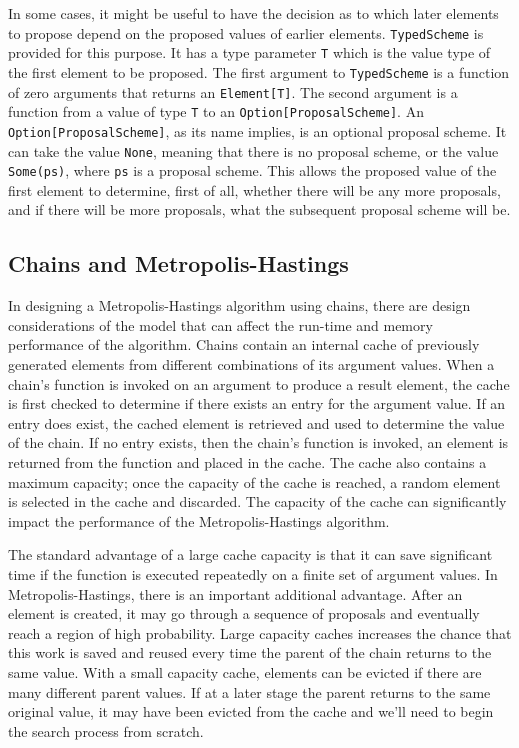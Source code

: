 In some cases, it might be useful to have the decision as to which later elements to propose depend on the proposed values of earlier elements. \texttt{TypedScheme} is provided for this purpose. It has a type parameter \texttt{T} which is the value type of the first element to be proposed. The first argument to \texttt{TypedScheme} is a function of zero arguments that returns an \texttt{Element[T]}. The second argument is a function from a value of type \texttt{T} to an \texttt{Option[ProposalScheme]}. An \texttt{Option[Proposal\-Scheme]}, as its name implies, is an optional proposal scheme. It can take the value \texttt{None}, meaning that there is no proposal scheme, or the value \texttt{Some(ps)}, where \texttt{ps} is a proposal scheme. This allows the proposed value of the first element to determine, first of all, whether there will be any more proposals, and if there will be more proposals, what the subsequent proposal scheme will be.

\subsection{Chains and Metropolis-Hastings}

In designing a Metropolis-Hastings algorithm using chains, there are design considerations of the model that can affect the run-time and memory performance of the algorithm. Chains contain an internal cache of previously generated elements from different combinations of its argument values. When a chain's function is invoked on an argument to produce a result element, the cache is first checked to determine if there exists an entry for the argument value. If an entry does exist, the cached element is retrieved and used to determine the value of the chain. If no entry exists, then the chain's function is invoked, an element is returned from the function and placed in the cache. The cache also contains a maximum capacity; once the capacity of the cache is reached, a random element is selected in the cache and discarded. The capacity of the cache can significantly impact the performance of the Metropolis-Hastings algorithm. 

The standard advantage of a large cache capacity is that it can save significant time if the function is executed repeatedly on a finite set of argument values. In Metropolis-Hastings, there is an important additional advantage. After an element is created, it may go through a sequence of proposals and eventually reach a region of high probability. Large capacity caches increases the chance that this work is saved and reused every time the parent of the chain returns to the same value. With a small capacity
cache, elements can be evicted if there are many different parent values. If at a later stage the parent returns to the same original value, it may have been evicted from the cache and we'll need to begin the
search process from scratch.


